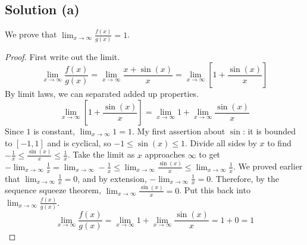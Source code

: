 \documentclass[11pt]{article}
\begin{document}
    \subsection{Solution (a)}
        We prove that $\lim_{x \to \infty} \frac{f(x)}{g(x)} = 1$.
        \begin{proof}
            First write out the limit.
            \begin{equation}
                \lim_{x \to \infty} \frac{f(x)}{g(x)} = \lim_{x \to \infty} \frac{x + \sin(x)}{x}
                    =   \lim_{x \to \infty} \left[ 1 + \frac{\sin(x)}{x} \right]
            \end{equation}
            By limit laws, we can separated added up properties. 
            \begin{equation}
                \lim_{x \to \infty} \left[ 1 + \frac{\sin(x)}{x} \right] = \lim_{x \to \infty} 1 + \lim_{x \to \infty} \frac{\sin(x)}{x}
            \end{equation}
            Since $1$ is constant, $\lim_{x \to \infty} 1 = 1$.
            My first assertion about $\sin$: it is bounded to $[-1,1]$ and is cyclical, so $-1 \leq \sin(x) \leq 1$.
            Divide all sides by $x$ to find $-\frac{1}{x} \leq \frac{\sin(x)}{x} \leq \frac{1}{x}$.
            Take the limit as $x$ approaches $\infty$ to get $-\lim_{x \to \infty} \frac{1}{x} = \lim_{x \to \infty} -\frac{1}{x} \leq \lim_{x \to \infty} \frac{\sin(x)}{x} \leq \lim_{x \to \infty} \frac{1}{x}$.
            We proved earlier that $\lim_{x \to \infty} \frac{1}{x} = 0$, and by extension, $-\lim_{x \to \infty} \frac{1}{x} = 0$.
            Therefore, by the sequence squeeze theorem, $\lim_{x \to \infty} \frac{\sin(x)}{x} = 0$.
            Put this back into $\lim_{x \to \infty} \frac{f(x)}{g(x)}$.
            \begin{equation}
                \lim_{x \to \infty} \frac{f(x)}{g(x)} = \lim_{x \to \infty} 1 + \lim_{x \to \infty} \frac{\sin(x)}{x} = 1 + 0 = 1
            \end{equation}
        \end{proof}
        
\end{document}
